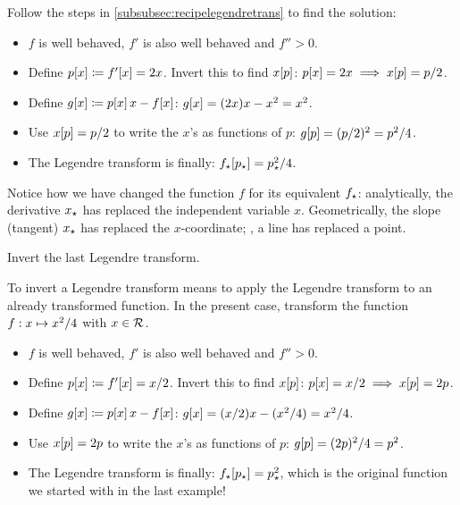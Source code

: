 \begin{solution}
Follow the steps in \cref{subsubsec:recipelegendretrans} to find the solution:
\begin{itemize}
\item $f$ is well behaved, $f'$ is also well behaved and $f'' > 0$.
\item Define $p\!\left[{x}\right] \coloneqq f'\!\left[{x}\right] = 2x$. Invert this to find $x\!\left[{p}\right]$: $p\!\left[{x}\right] = 2x\implies x\!\left[{p}\right] = p/2$.
\item Define $g\!\left[{x}\right] \coloneqq p\!\left[{x}\right] x - f\!\left[{x}\right]$: $g\!\left[{x}\right] = (2x)x - x^2 = x^2$.
\item Use $x\!\left[{p}\right] = p/2$ to write the $x$'s as functions of $p$: $g\!\left[{p}\right] = (p/2)^2 = p^2/4$.
\item The Legendre transform is finally: ${f}_{\star}\!\left[{{p}_{\star}}\right] = {p}_{\star}^2/4$.
\end{itemize}
Notice how we have changed the function $f$ for its equivalent ${f}_{\star}$: analytically, the derivative ${x}_{\star}$ has replaced the independent variable $x$. Geometrically, the slope (tangent) ${x}_{\star}$ has replaced the $x$-coordinate; \ie, a line has replaced a point.
\end{solution}


\begin{example}
Invert the last Legendre transform.
\end{example}

\begin{solution}
To invert a Legendre transform means to apply the Legendre transform to an already transformed function. In the present case, transform the function ${f}:{x}\mapsto{x^2/4}$ with $x\in\mathcal{R}$.

\begin{itemize}
\item $f$ is well behaved, $f'$ is also well behaved and $f'' > 0$.
\item Define $p\!\left[{x}\right] \coloneqq f'\!\left[{x}\right] = x/2$. Invert this to find $x\!\left[{p}\right]$: $p\!\left[{x}\right] = x/2\implies x\!\left[{p}\right] = 2p$.
\item Define $g\!\left[{x}\right] \coloneqq p\!\left[{x}\right] x - f\!\left[{x}\right]$: $g\!\left[{x}\right] = (x/2)x - (x^2/4) = x^2/4$.
\item Use $x\!\left[{p}\right] = 2p$ to write the $x$'s as functions of $p$: $g\!\left[{p}\right] = (2p)^2/4 = p^2$.
\item The Legendre transform is finally: ${f}_{\star}\!\left[{{p}_{\star}}\right] = {p}_{\star}^2$, which is the original function we started with in the last example!
\end{itemize}
\end{solution}


